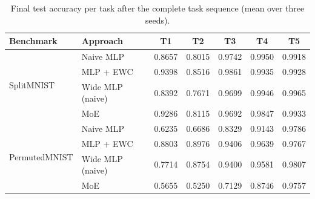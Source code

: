 \begin{table}[H]
  \centering
  \small
  \caption{Final test accuracy per task after the complete task sequence (mean over three seeds).}
  \label{tab:pertask}
  \begin{tabular}{llccccc}
    \toprule
    \textbf{Benchmark} & \textbf{Approach} & \textbf{T1} & \textbf{T2} & \textbf{T3} & \textbf{T4} & \textbf{T5} \\
    \midrule
    \multirow{4}{*}{SplitMNIST} & Naive MLP & 0.8657 & 0.8015 & 0.9742 & 0.9950 & 0.9918 \\
    & MLP + EWC & 0.9398 & 0.8516 & 0.9861 & 0.9935 & 0.9928 \\
    & Wide MLP (naive) & 0.8392 & 0.7671 & 0.9699 & 0.9946 & 0.9965 \\
    & MoE & 0.9286 & 0.8115 & 0.9692 & 0.9847 & 0.9933 \\
    \midrule
    \multirow{4}{*}{PermutedMNIST} & Naive MLP & 0.6235 & 0.6686 & 0.8329 & 0.9143 & 0.9786 \\
    & MLP + EWC & 0.8803 & 0.8976 & 0.9406 & 0.9639 & 0.9767 \\
    & Wide MLP (naive) & 0.7714 & 0.8754 & 0.9400 & 0.9581 & 0.9807 \\
    & MoE & 0.5655 & 0.5250 & 0.7129 & 0.8746 & 0.9757 \\
    \bottomrule
  \end{tabular}
\end{table}
